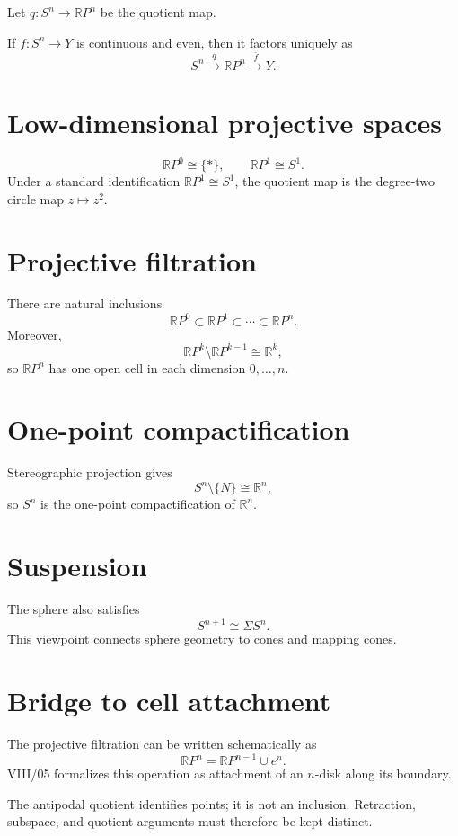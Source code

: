 Let \(q:S^n\to\mathbb RP^n\) be the quotient map.

\begin{proposition}\label{prop:viii04-factor}
If \(f:S^n\to Y\) is continuous and even, then it factors uniquely as
\[
S^n\xrightarrow{q}\mathbb RP^n\xrightarrow{\bar f}Y.
\]
\end{proposition}

\section{Low-dimensional projective spaces}
\[
\mathbb RP^0\cong\{*\},\qquad \mathbb RP^1\cong S^1.
\]
Under a standard identification \(\mathbb RP^1\cong S^1\), the quotient map is
the degree-two circle map \(z\mapsto z^2\).

\section{Projective filtration}
There are natural inclusions
\[
\mathbb RP^0\subset\mathbb RP^1\subset\cdots\subset\mathbb RP^n.
\]
Moreover,
\[
\mathbb RP^k\setminus\mathbb RP^{k-1}\cong\mathbb R^k,
\]
so \(\mathbb RP^n\) has one open cell in each dimension \(0,\dots,n\).

\section{One-point compactification}
Stereographic projection gives
\[
S^n\setminus\{N\}\cong\mathbb R^n,
\]
so \(S^n\) is the one-point compactification of \(\mathbb R^n\).

\section{Suspension}
The sphere also satisfies
\[
S^{n+1}\cong\Sigma S^n.
\]
This viewpoint connects sphere geometry to cones and mapping cones.

\section{Bridge to cell attachment}
The projective filtration can be written schematically as
\[
\mathbb RP^n=\mathbb RP^{n-1}\cup e^n.
\]
VIII/05 formalizes this operation as attachment of an \(n\)-disk along its
boundary.

\begin{warning}\label{warn:viii04-quotient}
The antipodal quotient identifies points; it is not an inclusion.  Retraction,
subspace, and quotient arguments must therefore be kept distinct.
\end{warning}


